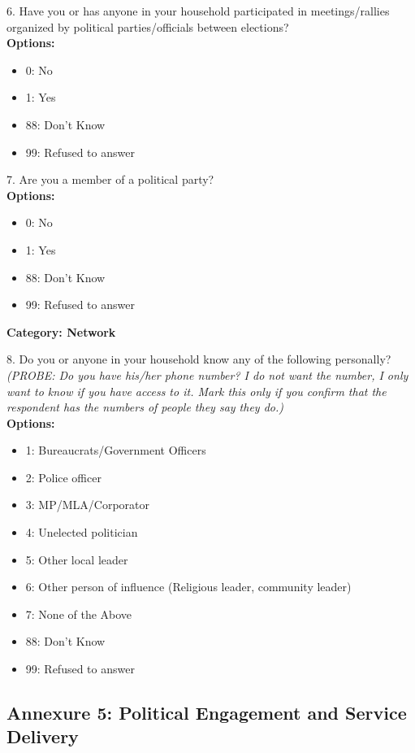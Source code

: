 6. Have you or has anyone in your household participated in meetings/rallies organized by political parties/officials between elections? \\
   \textbf{Options:}
   \begin{itemize}
       \item 0: No
       \item 1: Yes
       \item 88: Don’t Know
       \item 99: Refused to answer
   \end{itemize}

7. Are you a member of a political party? \\
   \textbf{Options:}
   \begin{itemize}
       \item 0: No
       \item 1: Yes
       \item 88: Don’t Know
       \item 99: Refused to answer
   \end{itemize}

\textbf{Category: Network}

8. Do you or anyone in your household know any of the following personally? \\
   \textit{(PROBE: Do you have his/her phone number? I do not want the number, I only want to know if you have access to it. Mark this only if you confirm that the respondent has the numbers of people they say they do.)} \\
   \textbf{Options:}
   \begin{itemize}
       \item 1: Bureaucrats/Government Officers
       \item 2: Police officer
       \item 3: MP/MLA/Corporator
       \item 4: Unelected politician
       \item 5: Other local leader
       \item 6: Other person of influence (Religious leader, community leader)
       \item 7: None of the Above
       \item 88: Don’t Know
       \item 99: Refused to answer
   \end{itemize}




\subsection{Annexure 5: Political Engagement and Service Delivery}

